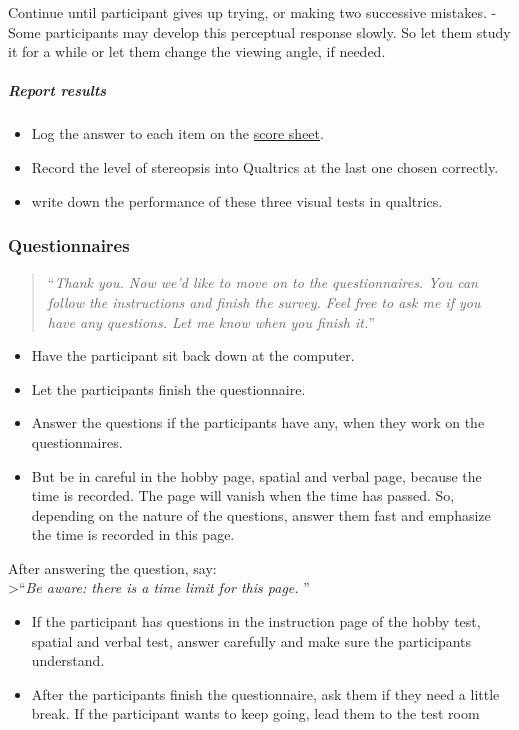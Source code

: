 \documentclass[]{article}
\providecommand{\tightlist}{%
  \setlength{\itemsep}{0pt}\setlength{\parskip}{0pt}}
\let\oldsubparagraph\subparagraph
\renewcommand{\subparagraph}[1]{\oldsubparagraph{#1}\mbox{}}
\begin{document}
Continue until participant gives up trying, or making two successive
mistakes. - Some participants may develop this perceptual response
slowly. So let them study it for a while or let them change the viewing
angle, if needed.

\hypertarget{report-results-2}{%
\subparagraph{Report results}\label{report-results-2}}

\begin{itemize}
\item
  Log the answer to each item on the
  \href{vision-screening-score-sheet.html}{score sheet}.
\item
  Record the level of stereopsis into Qualtrics at the last one chosen
  correctly.
\item
  write down the performance of these three visual tests in qualtrics.
\end{itemize}

\hypertarget{questionnaires}{%
\subsubsection{Questionnaires}\label{questionnaires}}

\begin{quote}
``\emph{Thank you. Now we'd like to move on to the questionnaires. You
can follow the instructions and finish the survey. Feel free to ask me
if you have any questions. Let me know when you finish it.}''
\end{quote}

\begin{itemize}
\tightlist
\item
  Have the participant sit back down at the computer.
\item
  Let the participants finish the questionnaire.
\item
  Answer the questions if the participants have any, when they work on
  the questionnaires.
\item
  But be in careful in the hobby page, spatial and verbal page, because
  the time is recorded. The page will vanish when the time has passed.
  So, depending on the nature of the questions, answer them fast and
  emphasize the time is recorded in this page.
\end{itemize}

After answering the question, say:\\
\textgreater{}``\emph{Be aware: there is a time limit for this page. }''

\begin{itemize}
\tightlist
\item
  If the participant has questions in the instruction page of the hobby
  test, spatial and verbal test, answer carefully and make sure the
  participants understand.
\item
  After the participants finish the questionnaire, ask them if they need
  a little break. If the participant wants to keep going, lead them to
  the test room
\end{itemize}
\end{document}
